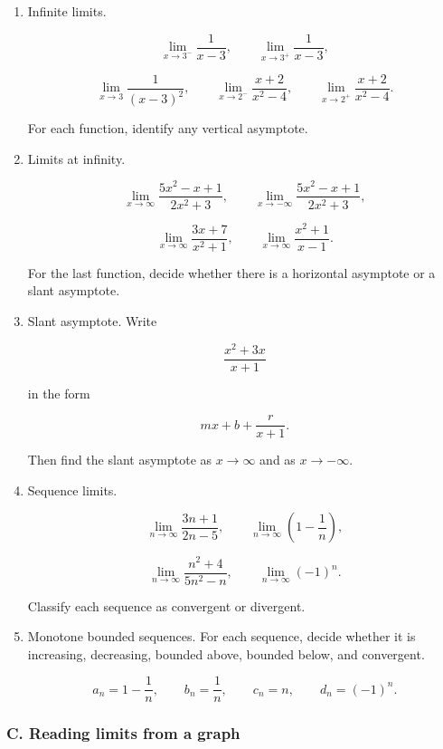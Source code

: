 \begin{enumerate}
Find the left-hand limit, right-hand limit, two-sided limit, and function value at \(x=2\).  Is this a removable discontinuity, a jump discontinuity, or neither?

\item Infinite limits.

\[
\lim_{x\to3^-}\frac1{x-3},
\qquad
\lim_{x\to3^+}\frac1{x-3},
\]

\[
\lim_{x\to3}\frac1{(x-3)^2},
\qquad
\lim_{x\to2^-}\frac{x+2}{x^2-4},
\qquad
\lim_{x\to2^+}\frac{x+2}{x^2-4}.
\]

For each function, identify any vertical asymptote.

\item Limits at infinity.

\[
\lim_{x\to\infty}\frac{5x^2-x+1}{2x^2+3},
\qquad
\lim_{x\to-\infty}\frac{5x^2-x+1}{2x^2+3},
\]

\[
\lim_{x\to\infty}\frac{3x+7}{x^2+1},
\qquad
\lim_{x\to\infty}\frac{x^2+1}{x-1}.
\]

For the last function, decide whether there is a horizontal asymptote or a slant asymptote.

\item Slant asymptote.  Write

\[
\frac{x^2+3x}{x+1}
\]

in the form

\[
mx+b+\frac{r}{x+1}.
\]

Then find the slant asymptote as \(x\to\infty\) and as \(x\to-\infty\).

\item Sequence limits.

\[
\lim_{n\to\infty}\frac{3n+1}{2n-5},
\qquad
\lim_{n\to\infty}\left(1-\frac1n\right),
\]

\[
\lim_{n\to\infty}\frac{n^2+4}{5n^2-n},
\qquad
\lim_{n\to\infty}(-1)^n.
\]

Classify each sequence as convergent or divergent.

\item Monotone bounded sequences.  For each sequence, decide whether it is increasing, decreasing, bounded above, bounded below, and convergent.

\[
a_n=1-\frac1n,
\qquad
b_n=\frac1n,
\qquad
c_n=n,
\qquad
d_n=(-1)^n.
\]
\end{enumerate}

\subsubsection*{C. Reading limits from a graph}

